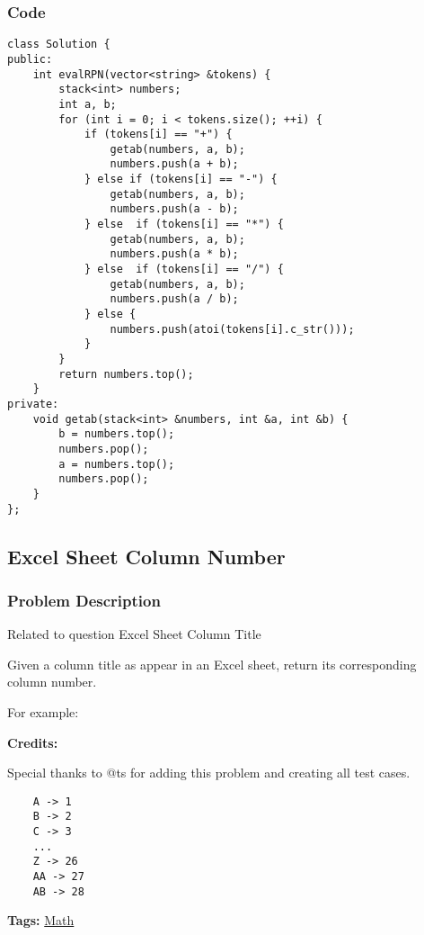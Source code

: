 \documentclass{article}
\begin{document}
\begin{CJK*}{UTF8}{gkai}
\subsubsection*{Code}
\begin{lstlisting}
class Solution {
public:
    int evalRPN(vector<string> &tokens) {
        stack<int> numbers;
        int a, b;
        for (int i = 0; i < tokens.size(); ++i) {
            if (tokens[i] == "+") {
                getab(numbers, a, b);
                numbers.push(a + b);
            } else if (tokens[i] == "-") {
                getab(numbers, a, b);
                numbers.push(a - b);
            } else  if (tokens[i] == "*") {
                getab(numbers, a, b);
                numbers.push(a * b);
            } else  if (tokens[i] == "/") {
                getab(numbers, a, b);
                numbers.push(a / b);
            } else {
                numbers.push(atoi(tokens[i].c_str()));
            }
        }
        return numbers.top();
    }
private:
    void getab(stack<int> &numbers, int &a, int &b) {
        b = numbers.top();
        numbers.pop();
        a = numbers.top();
        numbers.pop();
    }
}; 
\end{lstlisting}


\subsection{ Excel Sheet Column Number }
\label{ Excel Sheet Column Number }

\subsubsection*{Problem Description}
Related to question Excel Sheet Column Title

Given a column title as appear in an Excel sheet, return its corresponding column number.

For example:

\textbf{Credits:}

Special thanks to @ts for adding this problem and creating all test cases.

\begin{verbatim}
    A -> 1
    B -> 2
    C -> 3
    ...
    Z -> 26
    AA -> 27
    AB -> 28 
\end{verbatim}

\textbf{Tags: }
\hyperref[ Math ]{ Math }




\end{CJK*}
\end{document}
